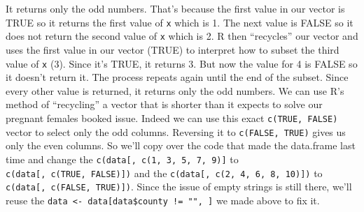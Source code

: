 \documentclass[
  12pt,
]{book}
\newenvironment{Shaded}{\begin{snugshade}}{\end{snugshade}}
\newcommand{\CommentTok}[1]{\textcolor[rgb]{0.37,0.37,0.37}{\textit{#1}}}
\newcommand{\DataTypeTok}[1]{\textcolor[rgb]{0.27,0.27,0.27}{#1}}
\newcommand{\KeywordTok}[1]{\textcolor[rgb]{0.27,0.27,0.27}{\textbf{#1}}}
\newcommand{\NormalTok}[1]{#1}
\newcommand{\OperatorTok}[1]{\textcolor[rgb]{0.43,0.43,0.43}{\textbf{#1}}}
\newcommand{\OtherTok}[1]{\textcolor[rgb]{0.37,0.37,0.37}{#1}}
\newcommand{\StringTok}[1]{\textcolor[rgb]{0.5,0.5,0.5}{#1}}
\begin{document}
It returns only the odd numbers. That's because the first value in our vector is TRUE so it returns the first value of \texttt{x} which is 1. The next value is FALSE so it does not return the second value of \texttt{x} which is 2. R then ``recycles'' our vector and uses the first value in our vector (TRUE) to interpret how to subset the third value of \texttt{x} (3). Since it's TRUE, it returns 3. But now the value for 4 is FALSE so it doesn't return it. The process repeats again until the end of the subset. Since every other value is returned, it returns only the odd numbers. We can use R's method of ``recycling'' a vector that is shorter than it expects to solve our pregnant females booked issue. Indeed we can use this exact \texttt{c(TRUE,\ FALSE)} vector to select only the odd columns. Reversing it to \texttt{c(FALSE,\ TRUE)} gives us only the even columns. So we'll copy over the code that made the data.frame last time and change the \texttt{c(data{[},\ c(1,\ 3,\ 5,\ 7,\ 9){]}} to \texttt{c(data{[},\ c(TRUE,\ FALSE){]})} and the \texttt{c(data{[},\ c(2,\ 4,\ 6,\ 8,\ 10){]})} to \texttt{c(data{[},\ c(FALSE,\ TRUE){]})}. Since the issue of empty strings is still there, we'll reuse the \texttt{data\ \textless{}-\ data{[}data\$county\ !=\ "",\ {]}} we made above to fix it.

\begin{Shaded}
\end{Shaded}
\end{document}

